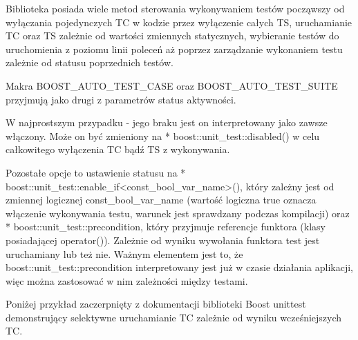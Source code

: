 \documentclass[12pt,a4paper,notitlepage]{report}
\begin{document}
Biblioteka posiada wiele metod sterowania wykonywaniem testów począwszy od wyłączania pojedynczych TC w kodzie przez wyłączenie całych TS, uruchamianie TC oraz TS zależnie od wartości zmiennych statycznych, wybieranie testów do uruchomienia z poziomu linii poleceń aż poprzez zarządzanie wykonaniem testu zależnie od statusu poprzednich testów.

Makra BOOST{\_}AUTO{\_}TEST{\_}CASE oraz BOOST{\_}AUTO{\_}TEST{\_}SUITE przyjmują jako drugi z parametrów status aktywności.

W najprostszym przypadku - jego braku jest on interpretowany jako zawsze włączony. Może on być zmieniony na * boost::unit{\_}test::disabled() w celu całkowitego wyłączenia TC bądź TS z wykonywania. 

Pozostałe opcje to ustawienie statusu na * boost::unit{\_}test::enable{\_}if<const{\_}bool{\_}var{\_}name>(), który zależny jest od zmiennej logicznej const{\_}bool{\_}var{\_}name (wartość logiczna true oznacza włączenie wykonywania testu, warunek jest sprawdzany podczas kompilacji) oraz * boost::unit{\_}test::precondition, który przyjmuje referencje funktora (klasy posiadającej operator()). Zależnie od wyniku wywołania funktora test jest uruchamiany lub też nie. Ważnym elementem jest to, że boost::unit{\_}test::precondition interpretowany jest już w czasie działania aplikacji, więc można zastosować w nim zależności między testami.

Poniżej przykład zaczerpnięty z dokumentacji biblioteki Boost unittest demonstrujący selektywne uruchamianie TC zależnie od wyniku wcześniejszych TC.
\end{document}
